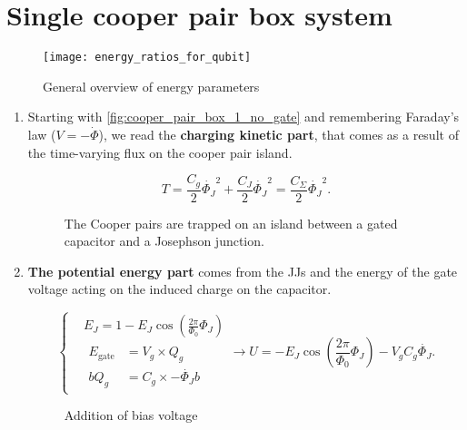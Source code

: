 \section{Single cooper pair box system\label{sec:cooper_pair_box}}
\begin{figure}[h]
  \centering \texttt{[image: energy\_ratios\_for\_qubit]}
  \caption{\small General overview of energy parameters\label{fig:energy_ratios_for_qubit}}
\end{figure}

\begin{enumerate}
\item Starting with \autoref{fig:cooper_pair_box_1_no_gate} and remembering Faraday's  law ($V = -\dot{\Phi}$), we read the
  \textbf{charging kinetic part}, that comes as a result of the time-varying flux on the cooper pair island.

  \begin{equation}
    T = \frac{C_g}{2}\dot{\Phi_J}^2 + \frac{C_J}{2}\dot{\Phi_J}^2 = \frac{C_\Sigma}{2}\dot{\Phi_J}^2.
  \end{equation}

  \begin{figure}[h]
    \centering {}
    \caption{\small  The  Cooper  pairs   are  trapped  on  an  island  between  a  gated   capacitor  and  a  Josephson
      junction.\label{fig:cooper_pair_box_1_no_gate}}
  \end{figure}

\item \textbf{The potential  energy part} comes from the  JJs and the energy  of the gate voltage acting  on the induced
  charge on the capacitor.

  \begin{equation}
    \left\{
      \begin{aligned}
        & E_J = 1 - E_J\cos(\frac{2\pi}{\Phi_0}\Phi_J)\\
        & \begin{aligned} E_\text{gate} & = V_g \times Q_g\\b Q_g & = C_g\times -\dot{\Phi_J}b
        \end{aligned}
      \end{aligned}\right.  \rightarrow U =
    -E_J\cos(\frac{2\pi}{\Phi_0}\Phi_J)
    -
    V_gC_g\dot{\Phi_J}.
  \end{equation}

  \begin{figure}[h]
    \centering {}
    \caption{\small Addition of bias voltage\label{fig:cooper_pair_box_2_with_gate}}
  \end{figure}


\end{enumerate}
